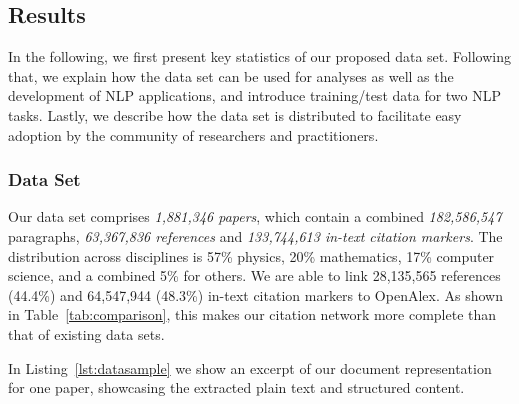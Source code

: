 \subsection{Results}

In the following, we first present key statistics of our proposed data set. Following that, we explain how the data set can be used for analyses as well as the development of NLP applications, and introduce training/test data for two NLP tasks. Lastly, we describe how the data set is distributed to facilitate easy adoption by the community of researchers and practitioners.

\subsubsection{Data Set}


Our data set comprises \emph{1,881,346 papers}, which contain a combined \emph{182,586,547} paragraphs, \emph{63,367,836 references} and \emph{133,744,613 in-text citation markers}. The distribution across disciplines is 57\% physics, 20\% mathematics, 17\% computer science, and a combined 5\% for others. %
We are able to link 28,135,565 references (44.4\%) and 64,547,944 (48.3\%) in-text citation markers to OpenAlex. As shown in Table~\ref{tab:comparison}, this makes our citation network more complete than that of existing data sets.

In Listing~\ref{lst:datasample} we show an excerpt of our document representation for one paper, showcasing the extracted plain text and structured content.

